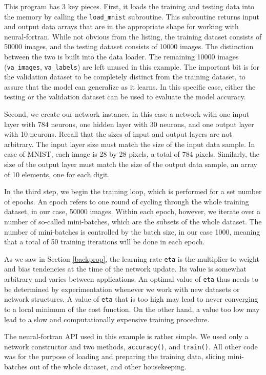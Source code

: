\documentclass[sigplan, review=false, screen=true, balance=true]{acmart}
\begin{document}
This program has 3 key pieces. First, it loads the training and testing data
into the memory by calling the \lstinline{load_mnist} subroutine. This subroutine
returns input and output data arrays that are in the appropriate shape for
working with neural-fortran. While not obvious from the listing, the training
dataset consists of 50000 images, and the testing dataset consists of 10000
images. The distinction between the two is built into the data loader.
The remaining 10000 images (\lstinline{va_images}, \lstinline{va_labels}) 
are left unused in this example. The important bit is for the validation
dataset to be completely distinct from the training dataset, to assure 
that the model can generalize as it learns. In this specific case,
either the testing or the validation dataset can be used to evaluate
the model accuracy.

Second, we create our network instance, in this case a network with one input
layer with 784 neurons, one hidden layer with 30 neurons, and one output layer
with 10 neurons. Recall that the sizes of input and output layers are not
arbitrary. The input layer size must match the size of the input data sample.
In case of MNIST, each image is 28 by 28 pixels, a total of 784 pixels.
Similarly, the size of the output layer must match the size of the output
data sample, an array of 10 elements, one for each digit.

In the third step, we begin the training loop, which is performed for a set
number of epochs. An epoch refers to one round of cycling through the whole
training dataset, in our case, 50000 images. Within each epoch, however,
we iterate over a number of so-called mini-batches, which are the subsets of
the whole dataset. The number of mini-batches is controlled by the batch size,
in our case 1000, meaning that a total of 50 training iterations will be done
in each epoch.

As we saw in Section \ref{backprop}, the learning rate \lstinline{eta} is the
multiplier to weight and bias tendencies at the time of the network update.
Its value is somewhat arbitrary and varies between applications. An optimal
value of \lstinline{eta} thus needs to be determined by experimentation whenever
we work with new datasets or network structures. A value of \lstinline{eta}
that is too high may lead to never converging to a local minimum of the cost
function. On the other hand, a value too low may lead to a slow and
computationally expensive training procedure.

The neural-fortran API used in this example is rather simple. We used only
a network constructor and two methods, \lstinline{accuracy()}, and
\lstinline{train()}. All other code was for the purpose of loading and
preparing the training data, slicing mini-batches out of the whole dataset,
and other housekeeping.
\end{document}
